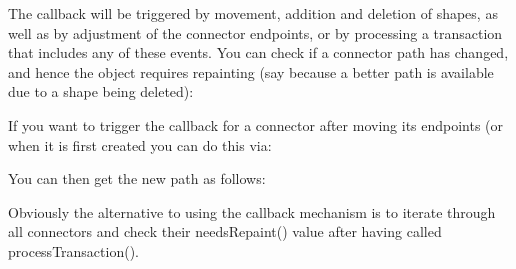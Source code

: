 The callback will be triggered by movement, addition and deletion of shapes, as well as by adjustment of the connector endpoints, or by processing a transaction that includes any of these events. You can check if a connector path has changed, and hence the object requires repainting (say because a better path is available due to a shape being deleted)\+: 
\begin{DoxyCode}{0}

\end{DoxyCode}


If you want to trigger the callback for a connector after moving its endpoints (or when it is first created you can do this via\+: 
\begin{DoxyCode}{0}

\end{DoxyCode}


You can then get the new path as follows\+:


\begin{DoxyCode}{0}
\DoxyCodeLine{\{}
\DoxyCodeLine{\} }

\end{DoxyCode}


Obviously the alternative to using the callback mechanism is to iterate through all connectors and check their needs\+Repaint() value after having called process\+Transaction().

